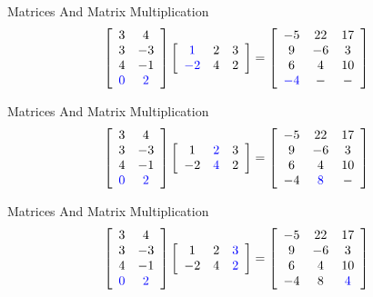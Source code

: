 \begin{frame}{Matrices And Matrix Multiplication}
\[ \left[ \begin{array}{cc} 3 & 4  \\ 3 & -3  \\ 4 & -1  \\ \textcolor{blue}{ 0 } & \textcolor{blue}{ 2 } \end{array} \right]  \left[ \begin{array}{ccc} \textcolor{blue}{ 1 } & 2 & 3  \\ \textcolor{blue}{ -2 } & 4 & 2 \end{array} \right]   =  \left[ \begin{array}{ccc} -5 & 22 & 17  \\ 9 & -6 & 3  \\ 6 & 4 & 10  \\ \textcolor{blue}{ -4 } & - & - \end{array} \right]  \]
\end{frame}


\begin{frame}{Matrices And Matrix Multiplication}
\[ \left[ \begin{array}{cc} 3 & 4  \\ 3 & -3  \\ 4 & -1  \\ \textcolor{blue}{ 0 } & \textcolor{blue}{ 2 } \end{array} \right]  \left[ \begin{array}{ccc} 1 & \textcolor{blue}{ 2 } & 3  \\ -2 & \textcolor{blue}{ 4 } & 2 \end{array} \right]   =  \left[ \begin{array}{ccc} -5 & 22 & 17  \\ 9 & -6 & 3  \\ 6 & 4 & 10  \\ -4 & \textcolor{blue}{ 8 } & - \end{array} \right]  \]
\end{frame}


\begin{frame}{Matrices And Matrix Multiplication}
\[ \left[ \begin{array}{cc} 3 & 4  \\ 3 & -3  \\ 4 & -1  \\ \textcolor{blue}{ 0 } & \textcolor{blue}{ 2 } \end{array} \right]  \left[ \begin{array}{ccc} 1 & 2 & \textcolor{blue}{ 3 }  \\ -2 & 4 & \textcolor{blue}{ 2 } \end{array} \right]   =  \left[ \begin{array}{ccc} -5 & 22 & 17  \\ 9 & -6 & 3  \\ 6 & 4 & 10  \\ -4 & 8 & \textcolor{blue}{ 4 } \end{array} \right]  \]
\end{frame}


